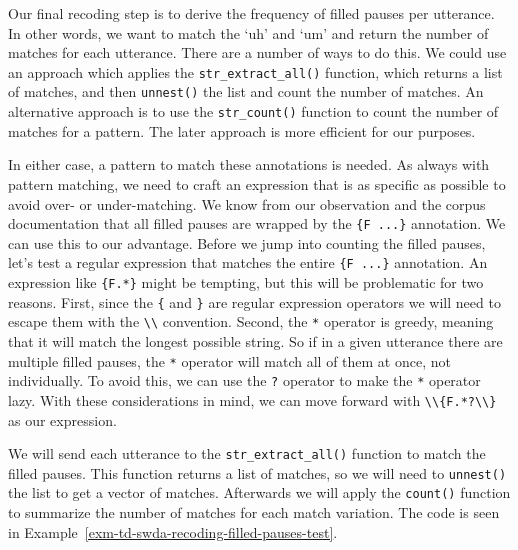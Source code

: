 \documentclass[
  letterpaper,
  DIV=11,
  numbers=noendperiod]{scrreport}
\theoremstyle{definition}
\theoremstyle{remark}
\begin{document}
Our final recoding step is to derive the frequency of filled pauses per
utterance. In other words, we want to match the `uh' and `um' and return
the number of matches for each utterance. There are a number of ways to
do this. We could use an approach which applies the
\texttt{str\_extract\_all()} function, which returns a list of matches,
and then \texttt{unnest()} the list and count the number of matches. An
alternative approach is to use the \texttt{str\_count()} function to
count the number of matches for a pattern. The later approach is more
efficient for our purposes.

In either case, a pattern to match these annotations is needed. As
always with pattern matching, we need to craft an expression that is as
specific as possible to avoid over- or under-matching. We know from our
observation and the corpus documentation that all filled pauses are
wrapped by the \texttt{\{F\ ...\}} annotation. We can use this to our
advantage. Before we jump into counting the filled pauses, let's test a
regular expression that matches the entire \texttt{\{F\ ...\}}
annotation. An expression like \texttt{\{F.*\}} might be tempting, but
this will be problematic for two reasons. First, since the \texttt{\{}
and \texttt{\}} are regular expression operators we will need to escape
them with the \texttt{\textbackslash{}\textbackslash{}} convention.
Second, the \texttt{*} operator is greedy, meaning that it will match
the longest possible string. So if in a given utterance there are
multiple filled pauses, the \texttt{*} operator will match all of them
at once, not individually. To avoid this, we can use the \texttt{?}
operator to make the \texttt{*} operator lazy. With these considerations
in mind, we can move forward with
\texttt{\textbackslash{}\textbackslash{}\{F.*?\textbackslash{}\textbackslash{}\}}
as our expression.

We will send each utterance to the \texttt{str\_extract\_all()} function
to match the filled pauses. This function returns a list of matches, so
we will need to \texttt{unnest()} the list to get a vector of matches.
Afterwards we will apply the \texttt{count()} function to summarize the
number of matches for each match variation. The code is seen in
Example~\ref{exm-td-swda-recoding-filled-pauses-test}.
\end{document}

